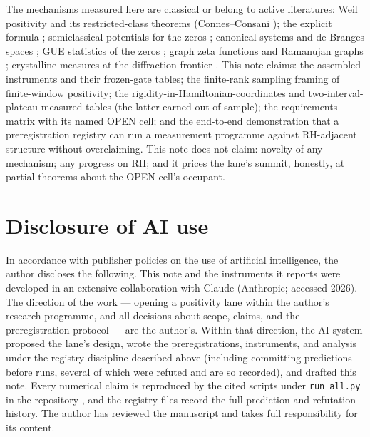 \documentclass[11pt]{article}
\theoremstyle{remark}
\begin{document}
The mechanisms measured here are classical or belong to active literatures: Weil positivity and its
restricted-class theorems (Connes--Consani \cite{ConnesConsani}); the explicit formula
\cite{Guinand,Weil52,Edwards}; semiclassical potentials for the zeros \cite{WuSprung,SchHutch,
BerryKeating}; canonical systems and de Branges spaces \cite{deBranges,Remling}; GUE statistics of
the zeros \cite{Montgomery,Odlyzko}; graph zeta functions and Ramanujan graphs
\cite{Ihara,Bass,Terras,LPS,Nilli}; crystalline measures at the diffraction frontier
\cite{KurasovSarnak}. This note claims: the assembled instruments and their frozen-gate tables; the
finite-rank sampling framing of finite-window positivity; the rigidity-in-Hamiltonian-coordinates
and two-interval-plateau measured tables (the latter earned out of sample); the requirements matrix
with its named OPEN cell; and the end-to-end demonstration that a preregistration registry can run a
measurement programme against RH-adjacent structure without overclaiming. This note does not claim:
novelty of any mechanism; any progress on RH; and it prices the lane's summit, honestly, at partial
theorems about the OPEN cell's occupant.

\section*{Disclosure of AI use}

In accordance with publisher policies on the use of artificial intelligence, the author discloses
the following. This note and the instruments it reports were developed in an extensive collaboration
with Claude (Anthropic; accessed 2026). The direction of the work --- opening a positivity lane
within the author's research programme, and all decisions about scope, claims, and the
preregistration protocol --- are the author's. Within that direction, the AI system proposed the
lane's design, wrote the preregistrations, instruments, and analysis under the registry discipline
described above (including committing predictions before runs, several of which were refuted and are
so recorded), and drafted this note. Every numerical claim is reproduced by the cited scripts under
\texttt{run\_all.py} in the repository \cite{Code}, and the registry files record the full
prediction-and-refutation history. The author has reviewed the manuscript and takes full
responsibility for its content.
\end{document}
